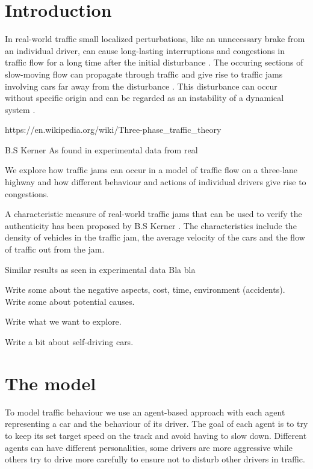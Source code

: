 \documentclass[11pt,a4paper,twocolumn]{article}
\begin{document}
\section{Introduction}
In real-world traffic small localized perturbations, like an unnecessary brake from an individual driver, can cause long-lasting interruptions and congestions in traffic flow for a long time after the initial disturbance \cite{kerner97flow}. The occuring sections of slow-moving flow can propagate through traffic and give rise to traffic jams involving cars far away from the disturbance \cite{kerner96trafficjam}. This disturbance can occur without specific origin and can be regarded as an instability of a dynamical system \cite{bando1995dynamical}. 

https://en.wikipedia.org/wiki/Three-phase\_traffic\_theory

B.S Kerner As found in experimental data from real 

We explore how traffic jams can occur in a model of traffic flow on a three-lane highway and how different behaviour and actions of individual drivers give rise to congestions.

A characteristic measure of real-world traffic jams that can be used to verify the authenticity has been proposed by B.S Kerner \cite{kerner96trafficjam}. The characteristics include the density of vehicles in the traffic jam, the average velocity of the cars and the flow of traffic out from the jam.

Similar results as seen in experimental data
Bla bla

Write some about the negative aspects, cost, time, environment (accidents). Write some about potential causes.

Write what we want to explore.

Write a bit about self-driving cars.



\section{The model}
To model traffic behaviour we use an agent-based approach with each agent representing a car and the behaviour of its driver. The goal of each agent is to try to keep its set target speed on the track and avoid having to slow down. Different agents can have different personalities, some drivers are more aggressive while others try to drive more carefully to ensure not to disturb other drivers in traffic.
\end{document}
